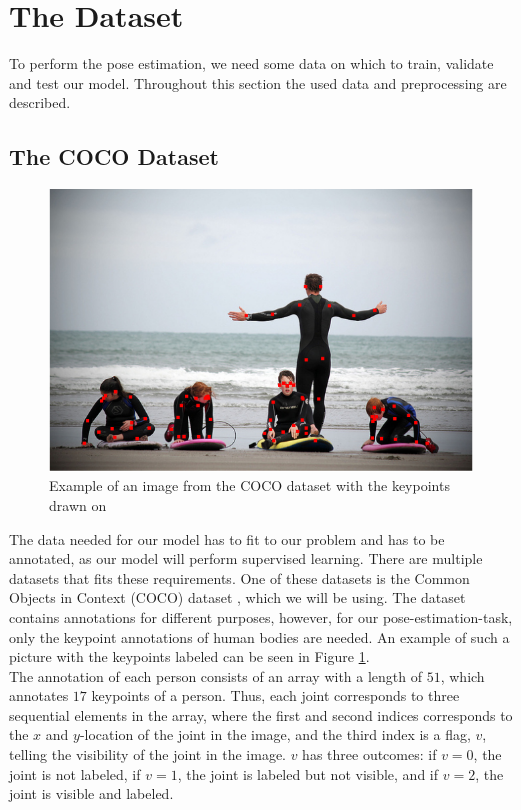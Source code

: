 \documentclass[main.tex]{subfiles}
\begin{document}
\section{The Dataset}
To perform the pose estimation, we need some data on which to train, validate and test our model. Throughout this section the used data and preprocessing are described.

\subsection{The COCO Dataset}
\begin{figure}[h]
    \centering
    \includegraphics[height = 4 cm]{./entities/coco_example.png}
    \caption{Example of an image from the COCO dataset with the keypoints drawn on \cite{COCO_article}}
    \label{fig:coco_example}
\end{figure}
The data needed for our model has to fit to our problem and has to be annotated, as our model will perform supervised learning. There are multiple datasets that fits these requirements. One of these datasets is the Common Objects in Context (COCO) dataset \cite{COCO_article}, which we will be using. The dataset contains annotations for different purposes, however, for our pose-estimation-task, only the keypoint annotations of human bodies are needed. An example of such a picture with the keypoints labeled can be seen in Figure \ref{fig:coco_example}. \\
The annotation of each person consists of an array with a length of $51$, which annotates $17$ keypoints of a person. Thus, each joint corresponds to three sequential elements in the array, where the first and second indices corresponds to the $x$ and $y$-location of the joint in the image, and the third index is a flag, $v$, telling the visibility of the joint in the image. $v$ has three outcomes: if $v = 0$, the joint is not labeled, if $v = 1$, the joint is labeled but not visible, and if $v = 2$, the joint is visible and labeled. \\
\end{document}
